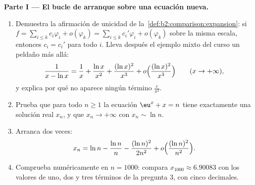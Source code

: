 \begin{problem}
\label{pb:b2:comparison:1}

\medskip
\noindent\textbf{Parte I --- El bucle de arranque sobre una
ecuación nueva.}
\begin{enumerate}
  \item Demuestra la afirmación de unicidad de la~\cref{def:b2:comparison:expansion}: si $f = \sum_{i\leq k}
        c_i\varphi_i + o(\varphi_k) = \sum_{i \leq k}
        c_i'\varphi_i + o(\varphi_k)$ sobre la misma escala,
        entonces $c_i = c_i'$ para todo $i$. Lleva después el
        ejemplo mixto del curso un peldaño más allá:
        \[
        \frac{1}{x - \ln x} = \frac1x + \frac{\ln x}{x^2} +
        \frac{(\ln x)^2}{x^3} + o\Bigl(\frac{(\ln
        x)^2}{x^3}\Bigr) \qquad (x \to +\infty),
        \]
        y explica por qué no aparece ningún término
        $\frac{c}{x^2}$.
  \item Prueba que para todo $n \geq 1$ la ecuación $\eu^x + x = n$
        tiene exactamente una solución real $x_n$, y que $x_n \to
        +\infty$ con $x_n \sim \ln n$.
  \item Arranca dos veces:
        \[
        x_n = \ln n - \frac{\ln n}{n} - \frac{(\ln n)^2}{2n^2} +
        o\Bigl(\frac{(\ln n)^2}{n^2}\Bigr).
        \]
  \item Comprueba numéricamente en $n = 1000$: compara $x_{1000}
        \approx 6.90083$ con los valores de uno, dos y tres términos
        de la pregunta 3, con cinco decimales.
\end{enumerate}


\end{problem}
